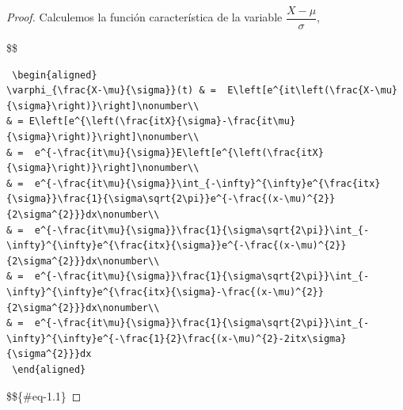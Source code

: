 \documentclass[
  letterpaper,
  DIV=11,
  numbers=noendperiod]{scrreprt}
\theoremstyle{definition}
\theoremstyle{plain}
\theoremstyle{remark}
\begin{document}
\begin{proof}

Calculemos la función característica de la variable
\(\dfrac{X-\mu}{\sigma}\),

\$\$

\begin{verbatim}
 \begin{aligned}
\varphi_{\frac{X-\mu}{\sigma}}(t) & =  E\left[e^{it\left(\frac{X-\mu}{\sigma}\right)}\right]\nonumber\\
& = E\left[e^{\left(\frac{itX}{\sigma}-\frac{it\mu}{\sigma}\right)}\right]\nonumber\\
& =  e^{-\frac{it\mu}{\sigma}}E\left[e^{\left(\frac{itX}{\sigma}\right)}\right]\nonumber\\
& =  e^{-\frac{it\mu}{\sigma}}\int_{-\infty}^{\infty}e^{\frac{itx}{\sigma}}\frac{1}{\sigma\sqrt{2\pi}}e^{-\frac{(x-\mu)^{2}}{2\sigma^{2}}}dx\nonumber\\
& =  e^{-\frac{it\mu}{\sigma}}\frac{1}{\sigma\sqrt{2\pi}}\int_{-\infty}^{\infty}e^{\frac{itx}{\sigma}}e^{-\frac{(x-\mu)^{2}}{2\sigma^{2}}}dx\nonumber\\
& =  e^{-\frac{it\mu}{\sigma}}\frac{1}{\sigma\sqrt{2\pi}}\int_{-\infty}^{\infty}e^{\frac{itx}{\sigma}-\frac{(x-\mu)^{2}}{2\sigma^{2}}}dx\nonumber\\
& =  e^{-\frac{it\mu}{\sigma}}\frac{1}{\sigma\sqrt{2\pi}}\int_{-\infty}^{\infty}e^{-\frac{1}{2}\frac{(x-\mu)^{2}-2itx\sigma}{\sigma^{2}}}dx
 \end{aligned}
\end{verbatim}

\$\$\{\#eq-1.1\}


\end{proof}
\end{document}
